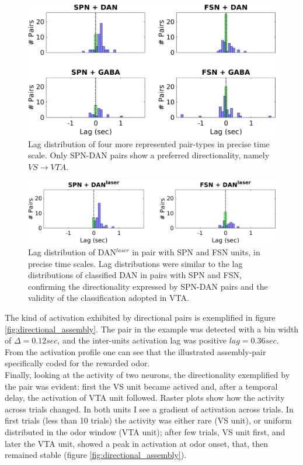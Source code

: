 \begin{figure}[H]
\centering
\includegraphics[scale=0.48]{figures/LagSec4Typo3VS.pdf}
\caption{Lag distribution of four more represented pair-types in precise time scale. Only SPN-DAN pairs show a preferred directionality, namely $VS\rightarrow VTA$.}
\label{fig:LagInSec4typo}
\end{figure}
\begin{figure}[H]
\centering
\includegraphics[scale=0.48]{figures/LagSecLaser3VS.pdf}
\caption{Lag distribution of DAN$^{laser}$ in pair with SPN and FSN units, in precise time scales. Lag distributions were similar to the lag distributions of classified DAN in pairs with SPN and FSN, confirming the directionality expressed by SPN-DAN pairs and the validity of the classification adopted in VTA.}
\label{fig:LagInSecLaser}
\end{figure}
The kind of activation exhibited by directional pairs is exemplified in figure \ref{fig:directional_assembly}. The pair in the example was detected with a bin width of $\Delta = 0.12 sec$, and the inter-units activation lag was positive $lag = 0.36 sec$. From the activation profile one can see that the illustrated assembly-pair specifically coded for the rewarded odor.\\Finally, looking at the activity of two neurons, the directionality exemplified by the pair was evident: first the VS unit became actived and, after a temporal delay, the activation of VTA unit followed. Raster plots show how the activity across trials changed. In both units I see a gradient of activation across trials. In first trials (less than 10 trials) the activity was either rare (VS unit), or uniform distributed in the odor window (VTA unit); after few trials, VS unit first, and later the VTA unit, showed a peak in activation at odor onset, that, then remained stable (figure \ref{fig:directional_assembly}).\\ 
